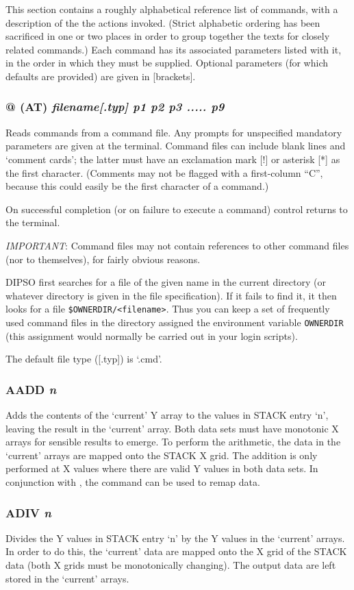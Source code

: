 \documentclass[twoside,11pt,noabs,nolof]{starlink}
\providecommand{\dipcom}[3]{\subsubsection*{\label{COM:#1}\xlabel{COM:#1}\textbf{#1} \emph{#2}}}
\begin{document}
This section contains a roughly alphabetical reference list of commands,
with a description of the the actions invoked.
(Strict alphabetic ordering has been sacrificed in one or two places in
order to group together the texts for closely related commands.) Each
command has its associated parameters listed with it, in the order in
which they must be supplied. Optional parameters (for which defaults are
provided) are given in [brackets].

\dipcom{@ (AT)}{filename[.typ] p1 p2 p3 ..... p9}{Reads commands from a command file}
Reads commands from a command file. Any
prompts for unspecified mandatory parameters are given at the
terminal. Command files can include blank lines and `comment cards';
the latter must have an exclamation mark [!] or asterisk [*] as the
first character. (Comments may not be flagged with a first-column
``C'', because this could easily be the first character of a command.)

On successful completion (or on failure to execute a command) control
returns to the terminal.

\emph{IMPORTANT}: Command files may not contain references to other
command files (nor to themselves), for fairly obvious reasons.

DIPSO first searches for a file of the given name in the current directory (or
whatever directory is given in the file specification). If it fails to find it,
it then looks for a file {\verb+$OWNERDIR/<filename>+}. Thus you can keep a set
of frequently used command files in the directory assigned the environment
variable {\texttt{OWNERDIR}}  (this assignment would normally be carried
out in your login scripts).

The default file type ([.typ]) is `.cmd'.

\dipcom{AADD}{n}{Adds the Y values in two arrays}
Adds the contents of the `current' Y array to the values in STACK
entry `n', leaving the result in the `current' array. Both data sets
must have monotonic X arrays for sensible results to emerge. To
perform the arithmetic, the data in the `current' arrays are mapped
onto the STACK X grid. The addition is only performed at X values
where there are valid Y values in both data sets. In conjunction with
,  the   command can be used to remap data.

\dipcom{ADIV}{n}{Divides the Y values in two arrays}
Divides the Y values in STACK entry `n' by the Y values in the
`current' arrays. In order to do this, the `current' data are mapped
onto the X grid of the STACK data (both X grids must be monotonically
changing). The output data are left stored in the `current' arrays.
\end{document}
